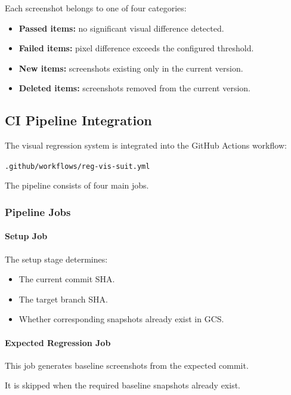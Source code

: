 Each screenshot belongs to one of four categories:

\begin{itemize}
    \item \textbf{Passed items:} no significant visual difference detected.
    \item \textbf{Failed items:} pixel difference exceeds the configured threshold.
    \item \textbf{New items:} screenshots existing only in the current version.
    \item \textbf{Deleted items:} screenshots removed from the current version.
\end{itemize}


\subsection{CI Pipeline Integration}

The visual regression system is integrated into the GitHub Actions workflow:

\texttt{.github/workflows/reg-vis-suit.yml}

The pipeline consists of four main jobs.

\subsubsection{Pipeline Jobs}

\paragraph{Setup Job}

The setup stage determines:

\begin{itemize}
    \item The current commit SHA.
    \item The target branch SHA.
    \item Whether corresponding snapshots already exist in GCS.
\end{itemize}


\paragraph{Expected Regression Job}

This job generates baseline screenshots from the expected commit.

It is skipped when the required baseline snapshots already exist.


